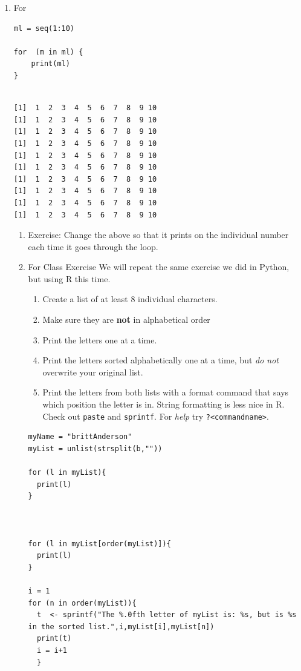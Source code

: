 \documentclass{article}
\begin{document}
\begin{enumerate}
\item For
\label{sec:org83ea6b7}
\begin{verbatim}
ml = seq(1:10)

for  (m in ml) {
    print(ml)
}
\end{verbatim}

\begin{verbatim}

[1]  1  2  3  4  5  6  7  8  9 10
[1]  1  2  3  4  5  6  7  8  9 10
[1]  1  2  3  4  5  6  7  8  9 10
[1]  1  2  3  4  5  6  7  8  9 10
[1]  1  2  3  4  5  6  7  8  9 10
[1]  1  2  3  4  5  6  7  8  9 10
[1]  1  2  3  4  5  6  7  8  9 10
[1]  1  2  3  4  5  6  7  8  9 10
[1]  1  2  3  4  5  6  7  8  9 10
[1]  1  2  3  4  5  6  7  8  9 10
\end{verbatim}
\begin{enumerate}
\item Exercise:
\label{sec:org3ba2cb7}
Change the above so that it prints on the individual number each time it goes through the loop. 

\item For Class Exercise
\label{sec:orgf3dc7a9}
We will repeat the same exercise we did in Python, but using R this time. 
\begin{enumerate}
\item Create a list of at least 8 individual characters.
\item Make sure they are \textbf{\textbf{not}} in alphabetical order
\item Print the letters one at a time.
\item Print the letters sorted alphabetically one at a time, but \emph{do not} overwrite your original list.
\item Print the letters from both lists with a format command that says which position the letter is in. String formatting is less nice in R. Check out \texttt{paste} and \texttt{sprintf}. For \emph{help} try \texttt{?<commandname>}.
\end{enumerate}

\begin{verbatim}
myName = "brittAnderson"
myList = unlist(strsplit(b,""))

for (l in myList){
  print(l)
}



for (l in myList[order(myList)]){
  print(l)
}

i = 1
for (n in order(myList)){
  t  <- sprintf("The %.0fth letter of myList is: %s, but is %s in the sorted list.",i,myList[i],myList[n])
  print(t)
  i = i+1  
  }
\end{verbatim}


\end{enumerate}
\end{enumerate}
\end{document}
